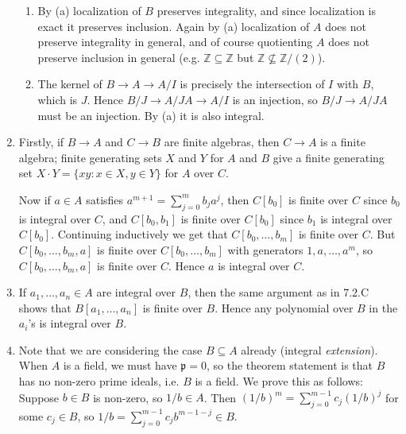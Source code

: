 \documentclass{report}
\newcommand{\p}{\mathfrak{p}}
\newcommand{\Z}{\mathbb{Z}}
\begin{document}
\begin{enumerate}[label=\textbf{7.2.\Alph*.}]
\begin{enumerate}[label=(\alph*)]
		      \item By (a) localization of $B$ preserves integrality, and since
		            localization is exact it preserves inclusion. Again by (a)
		            localization of $A$ does not preserve integrality in general,
		            and of course quotienting $A$ does not preserve inclusion in
		            general (e.g. $\Z\subseteq\Z$ but $\Z\nsubseteq\Z/(2)$).

		      \item The kernel of $B\to A\to A/I$ is precisely the intersection of
		            $I$ with $B$, which is $J$. Hence $B/J\to A/JA\to A/I$ is an
		            injection, so $B/J\to A/JA$ must be an injection. By (a) it is
		            also integral.
	      \end{enumerate}

	\item Firstly, if $B\to A$ and $C\to B$ are finite algebras, then $C\to A$
	      is a finite algebra; finite generating sets $X$ and $Y$ for $A$ and $B$
	      give a finite generating set $X\cdot Y=\{xy:x\in X,y\in Y\}$ for $A$
	      over $C$.

	      Now if $a\in A$ satisfies $a^{m+1}=\sum_{j=0}^mb_ja^j$, then $C[b_0]$ is
	      finite over $C$ since $b_0$ is integral over $C$, and $C[b_0,b_1]$ is
	      finite over $C[b_0]$ since $b_1$ is integral over $C[b_0]$. Continuing
	      inductively we get that $C[b_0,\ldots,b_m]$ is finite over $C$. But
	      $C[b_0,\ldots,b_m,a]$ is finite over $C[b_0,\ldots,b_m]$ with generators
	      $1,a,\ldots,a^m$, so $C[b_0,\ldots,b_m,a]$ is finite over $C$. Hence $a$
	      is integral over $C$.

	\item If $a_1,\ldots,a_n\in A$ are integral over $B$, then the same argument
	      as in 7.2.C shows that $B[a_1,\ldots,a_n]$ is finite over $B$. Hence any
	      polynomial over $B$ in the $a_i$'s is integral over $B$.

	\item Note that we are considering the case $B\subseteq A$ already (integral
	      \emph{extension}). When $A$ is a field, we must have $\p=0$, so the
	      theorem statement is that $B$ has no non-zero prime ideals, i.e. $B$ is
	      a field. We prove this as follows: Suppose $b\in B$ is non-zero, so
	      $1/b\in A$. Then $(1/b)^m=\sum_{j=0}^{m-1}c_j(1/b)^j$ for some
	      $c_j\in B$, so $1/b=\sum_{j=0}^{m-1}c_jb^{m-1-j}\in B$.


\end{enumerate}
\end{document}
